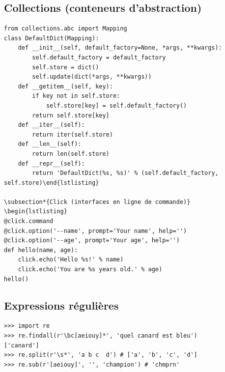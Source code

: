 \documentclass{article}
\begin{document}
\begin{multicols*}{4}
\subsection*{Collections (conteneurs d'abstraction)}
\begin{lstlisting}
from collections.abc import Mapping
class DefaultDict(Mapping):
    def __init__(self, default_factory=None, *args, **kwargs):
        self.default_factory = default_factory
        self.store = dict()
        self.update(dict(*args, **kwargs))
    def __getitem__(self, key):
        if key not in self.store:
            self.store[key] = self.default_factory()
        return self.store[key]
    def __iter__(self):
        return iter(self.store)
    def __len__(self):
        return len(self.store)
    def __repr__(self):
        return 'DefaultDict(%s, %s)' % (self.default_factory, self.store)\end{lstlisting}

\subsection*{Click (interfaces en ligne de commande)}
\begin{lstlisting}
@click.command
@click.option('--name', prompt='Your name', help='')
@click.option('--age', prompt='Your age', help='')
def hello(name, age):
    click.echo('Hello %s!' % name)
    click.echo('You are %s years old.' % age)
hello()\end{lstlisting}

\subsection*{Expressions régulières}
\begin{lstlisting}
>>> import re
>>> re.findall(r'\bc[aeiouy]*', 'quel canard est bleu')
['canard']
>>> re.split(r'\s*', 'a b c  d') # ['a', 'b', 'c', 'd']
>>> re.sub(r'[aeiouy]', '', 'champion') # 'chmprn'\end{lstlisting}


\end{multicols*}
\end{document}
